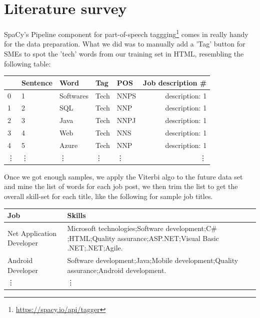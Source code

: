 \section{Literature survey}
SpaCy's Pipeline component for part-of-speech taggging\footnote{\url {https://spacy.io/api/tagger}} comes in  really handy for the  data preparation. What we did was to manually add a 'Tag' button for SMEs to spot the 'tech' words from our training set in HTML, resembling the following table:
{
	\begin{center}
		\begin{tabular}{| l | l | l | l | l | r| } 
			\hline
			&	Sentence	&	Word	&	Tag	 & POS &	Job description \# \\ \hline
			0	&	1	&	Softwares		&Tech	& NNPS	&description: 1 \\ \hline
			1	&	2	&	SQL	&	Tech	& NNP &	description: 1 \\ \hline
			2	&	3	&	Java	&	Tech & NNPJ	&	description: 1	\\ \hline
			3		&4		&Web	&	Tech	& NNS&	description: 1\\ \hline
			4	&	5	&	Azure		&Tech	& NNP	&description: 1\\ \hline
			\vdots	&		\vdots	&		\vdots		&	\vdots	&	\vdots	&	\vdots\\ \hline
		\end{tabular}
\end{center}}
Once we got enough samples, we apply the Viterbi algo to the future data set and mine the list of words for each job post, we then trim the list to get the overall skill-set for each title, like the following for sample job titles.  

\begin{center}
	\begin{tabular}{ | p{2.5cm} |p{4.5cm} |}
		\hline
		Job & Skills \\ \hline
		Net Application Developer& Microsoft technologies;Software development;C$\#$;HTML;Quality assurance;ASP.NET;Visual Basic .NET;.NET;Agile.\\\hline
		Android Developer	& Software development;Java;Mobile development;Quality assurance;Android development.\\\hline
		\vdots	&	\vdots\\ \hline
	\end{tabular}
\end{center}
